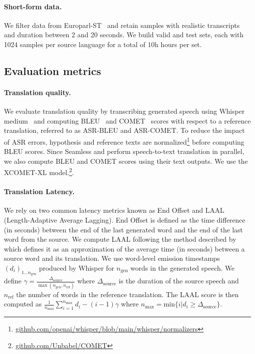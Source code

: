 \paragraph{Short-form data.}
We filter data from Europarl-ST~\citep{europarl_st} and retain samples with realistic transcripts and duration between 2 and 20 seconds. We build valid and test sets, each with 1024 samples per source language for a total of 10h hours per set.


\subsection{Evaluation metrics}
\label{sec:eval_metrics}

\paragraph{Translation quality.} We evaluate translation quality by transcribing generated speech using Whisper medium~\cite{whisper} and computing BLEU~\cite{sacrebleu} and COMET~\cite{comet} scores with respect to a reference translation, referred to as ASR-BLEU and ASR-COMET. To reduce the impact of ASR errors, hypothesis and reference texts are normalized\footnote{\href{https://github.com/openai/whisper/blob/main/whisper/normalizers/english.py}{github.com/openai/whisper/blob/main/whisper/normalizers}} before computing BLEU scores. Since Seamless and \ours{} perform speech-to-text translation in parallel, we also compute BLEU and COMET scores using their text outputs. We use the XCOMET-XL model.\footnote{\href{https://github.com/Unbabel/COMET}{github.com/Unbabel/COMET}}.

\paragraph{Translation Latency.} We rely on two common latency metrics known as End Offset and LAAL (Length-Adaptive Average Lagging). End Offset is defined as the time difference (in seconds) between the end of the last generated word and the end of the last word from the source. We compute LAAL following the method described by \citet{laal} which defines it as an approximation of the average time (in seconds) between a source word and its translation. We use word-level emission timestamps $(d_i)_{1 \dots n_{\mathrm{gen}}}$ produced by Whisper for $n_{\mathrm{gen}}$ words in the generated speech. We define $\gamma = \frac{\Delta_{\mathrm{source}}}{\max(n_{\mathrm{gen}}, n_{\mathrm{ref}})}$ where $\Delta_{\mathrm{source}}$ is the duration of the source speech and $n_{\mathrm{ref}}$ the number of words in the reference translation. The LAAL score is then computed as $\frac{1}{n_{\mathrm{max}}}\sum_{i=1}^{n_{\mathrm{max}}} d_i - (i-1)\gamma$ where $n_{\mathrm{max}} = \mathrm{min}\{i|d_i \geq \Delta_{\mathrm{source}}\}$.

